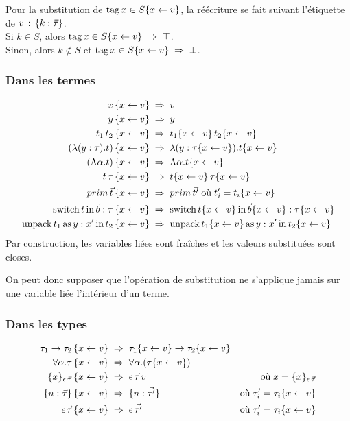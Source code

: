 Pour la substitution de $\operatorname{tag} x \in S \{x \leftarrow v\}$, la réécriture se fait
suivant l'étiquette de $v \,:\, \{k : \vec{\tau}\}$. \\
Si $k \in S$, alors $\operatorname{tag} x \in S \{x \leftarrow v\} \;\Rightarrow\; \top$. \\
Sinon, alors $k \notin S$ et $\operatorname{tag} x \in S \{x \leftarrow v\} \;\Rightarrow\; \bot$.

\subsubsection{Dans les termes}
\begin{align*}
  x
   \, \{x \leftarrow v\} \;&\Rightarrow\; v
    \\
  y
   \, \{x \leftarrow v\} \;&\Rightarrow\; y
    \\
  t_1 \, t_2
   \, \{x \leftarrow v\} \;&\Rightarrow\; t_1 \{x \leftarrow v\} \, t_2 \{x \leftarrow v\}
    \\
  (\lambda (y : \tau) . t)
   \, \{x \leftarrow v\} \;&\Rightarrow\; \lambda (y : \tau \{x \leftarrow v\}) . t \{x \leftarrow v\}
    \\
  (\Lambda \alpha . t)
   \, \{x \leftarrow v\} \;&\Rightarrow\; \Lambda \alpha . t \{x \leftarrow v\}
    \\
  t \, \tau
   \, \{x \leftarrow v\} \;&\Rightarrow\; t \{x \leftarrow v\} \, \tau \{x \leftarrow v\}
    \\
  prim \, \vec{t}
   \, \{x \leftarrow v\} \;&\Rightarrow\; prim \, \vec{t'} \; \text{où} \; t'_i = t_i \{x \leftarrow v\}
    \\
  \operatorname{switch} t \operatorname{in} \vec{b} : \tau
   \, \{x \leftarrow v\} \;&\Rightarrow\; 
  \operatorname{switch} t \{x \leftarrow v\} \operatorname{in} \vec{b} \{x \leftarrow v\} : \tau \{x \leftarrow v\} 
    \\
  \operatorname{unpack} t_1 \operatorname{as} y : x' \operatorname{in} t_2
   \, \{x \leftarrow v\} \;&\Rightarrow\; 
  \operatorname{unpack} t_1 \{x \leftarrow v\} \operatorname{as} y : x' \operatorname{in} t_2 \{x \leftarrow v\}
    \\
\end{align*}
%
Par construction, les variables liées sont fraîches et les valeurs substituées
sont closes.

On peut donc supposer que l'opération de substitution ne s'applique jamais sur
une variable liée l'intérieur d'un terme.

\subsubsection{Dans les types}
\begin{align*}
  \tau_1 \rightarrow \tau_2
   \, \{x \leftarrow v\} \;&\Rightarrow\; 
    \tau_1 \{x \leftarrow v\} \rightarrow \tau_2 \{x \leftarrow v\}
  \\
  \forall \alpha. \tau
   \, \{x \leftarrow v\} \;&\Rightarrow\; 
  \forall \alpha. (\tau \{x \leftarrow v\})
  \\
  \{ x \}_{\epsilon \, \vec{\tau}}
   \, \{x \leftarrow v\} \;&\Rightarrow\; 
   {\epsilon \, \vec{\tau}} \, v
   &\text{où}\; x = \{ x \}_{\epsilon \, \vec{\tau}}
  \\
  \{ n: \vec{\tau} \}
    \, \{x \leftarrow v\} \;&\Rightarrow\; 
    \{ n: \vec{\tau'} \}
    &\text{où}\; \tau'_i = \tau_i \{x \leftarrow v\}
  \\
  \epsilon \, \vec{\tau}
    \, \{x \leftarrow v\} \;&\Rightarrow\; \epsilon \, \vec{\tau'}
    &\text{où}\; \tau'_i = \tau_i \{x \leftarrow v\}
\end{align*}

